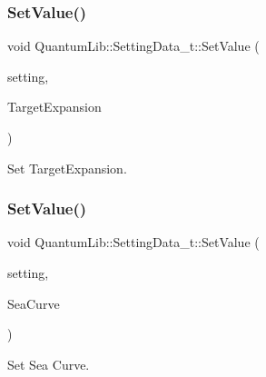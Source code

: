 \subsubsection{\texorpdfstring{Set\+Value()}{SetValue()}\hspace{0.1cm}{\footnotesize\ttfamily [17/26]}}
{\footnotesize\ttfamily void Quantum\+Lib\+::\+Setting\+Data\+\_\+t\+::\+Set\+Value (\begin{DoxyParamCaption}\item[{\mbox{\hyperlink{namespace_quantum_lib_acc8124e3e65bca4aa798d03a55e3d54c}{e\+Settings\+\_\+t}}}]{setting,  }\item[{\mbox{\hyperlink{namespace_quantum_lib_affbc8bc0775b14917688e0e6d2fab0fb}{e\+Target\+Expansion\+\_\+t}}}]{Target\+Expansion }\end{DoxyParamCaption})\hspace{0.3cm}{\ttfamily [inline]}}



Set Target\+Expansion. 

\mbox{\label{struct_quantum_lib_1_1_setting_data__t_acd333656320fa69fa9370015855825e2}} 
\subsubsection{\texorpdfstring{Set\+Value()}{SetValue()}\hspace{0.1cm}{\footnotesize\ttfamily [18/26]}}
{\footnotesize\ttfamily void Quantum\+Lib\+::\+Setting\+Data\+\_\+t\+::\+Set\+Value (\begin{DoxyParamCaption}\item[{\mbox{\hyperlink{namespace_quantum_lib_acc8124e3e65bca4aa798d03a55e3d54c}{e\+Settings\+\_\+t}}}]{setting,  }\item[{\mbox{\hyperlink{namespace_quantum_lib_aeaeea421c9323b85e6b45fa78e3b2a06}{e\+Sea\+Curve\+\_\+t}}}]{Sea\+Curve }\end{DoxyParamCaption})\hspace{0.3cm}{\ttfamily [inline]}}



Set Sea Curve. 

\mbox{\label{struct_quantum_lib_1_1_setting_data__t_a6942f85824f41fa3a45b6989e2cb7e4e}} 
